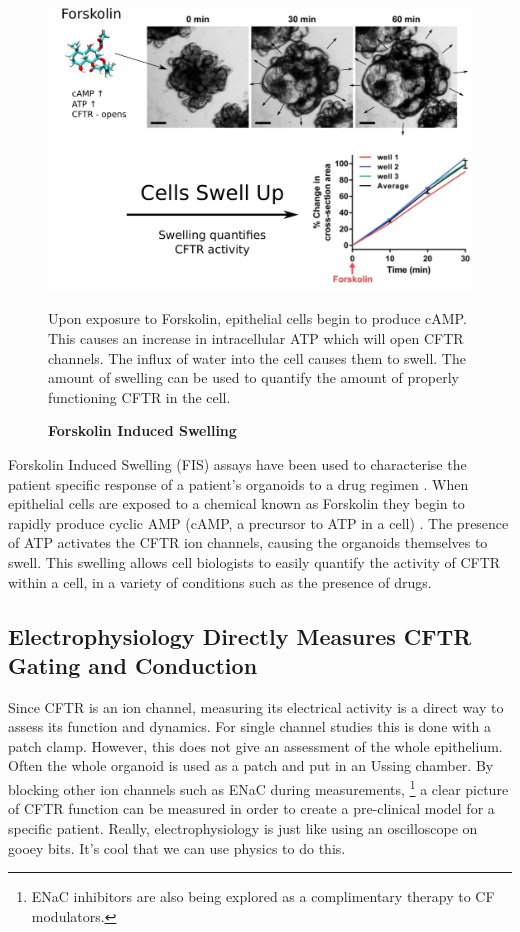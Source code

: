 \begin{figure}
	\label{western_blot}
	\begin{center}
	\includegraphics[width=1\textwidth]{figures/FIS_demo.pdf}
	\end{center}
	\captionsetup{singlelinecheck = false, justification=raggedright}
	\caption[Forskolin Induced Swelling] {\textbf{Forskolin Induced Swelling}}{Upon exposure to Forskolin, epithelial cells begin to produce cAMP. This causes an increase in intracellular ATP which will open CFTR channels. The influx of water into the cell causes them to swell. The amount of swelling can be used to quantify the amount of properly functioning CFTR in the cell.} 
\end{figure}
Forskolin Induced Swelling (FIS) assays have been used to characterise the patient specific response of a patient's organoids to a drug regimen \cite{dekkers2013}. When epithelial cells are exposed to a chemical known as Forskolin they begin to rapidly produce cyclic AMP (cAMP, a precursor to ATP in a cell) \cite{bonora2012}. The presence of ATP activates the CFTR ion channels, causing the organoids themselves to swell. This swelling allows cell biologists to easily quantify the activity of CFTR within a cell, in a variety of conditions such as the presence of drugs.

\subsection{Electrophysiology Directly Measures CFTR Gating and Conduction}
Since CFTR is an ion channel, measuring its electrical activity is a direct way to assess its function and dynamics. For single channel studies this is done with a patch clamp. However, this does not give an assessment of the whole epithelium. Often the whole organoid is used as a patch and put in an Ussing chamber. By blocking other ion channels such as ENaC during measurements, \footnote{ENaC inhibitors are also being explored as a complimentary therapy to CF modulators\cite{mall2020}.} a clear picture of CFTR function can be measured in order to create a pre-clinical model for a specific patient. Really, electrophysiology is just like using an oscilloscope on gooey bits. It's cool that we can use physics to do this. 

